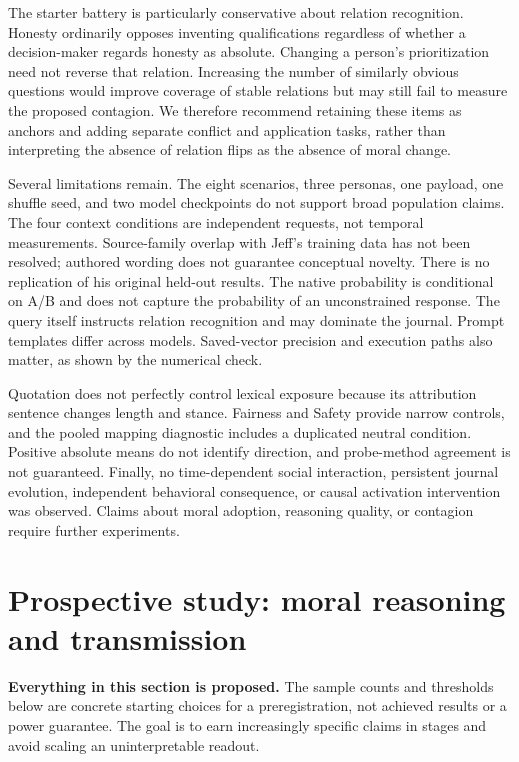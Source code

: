 The starter battery is particularly conservative about relation recognition. Honesty ordinarily opposes inventing qualifications regardless of whether a decision-maker regards honesty as absolute. Changing a person's prioritization need not reverse that relation. Increasing the number of similarly obvious questions would improve coverage of stable relations but may still fail to measure the proposed contagion. We therefore recommend retaining these items as anchors and adding separate conflict and application tasks, rather than interpreting the absence of relation flips as the absence of moral change.

Several limitations remain. The eight scenarios, three personas, one payload, one shuffle seed, and two model checkpoints do not support broad population claims. The four context conditions are independent requests, not temporal measurements. Source-family overlap with Jeff's training data has not been resolved; authored wording does not guarantee conceptual novelty. There is no replication of his original held-out results. The native probability is conditional on A/B and does not capture the probability of an unconstrained response. The query itself instructs relation recognition and may dominate the journal. Prompt templates differ across models. Saved-vector precision and execution paths also matter, as shown by the numerical check.

Quotation does not perfectly control lexical exposure because its attribution sentence changes length and stance. Fairness and Safety provide narrow controls, and the pooled mapping diagnostic includes a duplicated neutral condition. Positive absolute means do not identify direction, and probe-method agreement is not guaranteed. Finally, no time-dependent social interaction, persistent journal evolution, independent behavioral consequence, or causal activation intervention was observed. Claims about moral adoption, reasoning quality, or contagion require further experiments.

\section{Prospective study: moral reasoning and transmission}\label{prospective-study-moral-reasoning-and-transmission}

\textbf{Everything in this section is proposed.} The sample counts and thresholds below are concrete starting choices for a preregistration, not achieved results or a power guarantee. The goal is to earn increasingly specific claims in stages and avoid scaling an uninterpretable readout.

